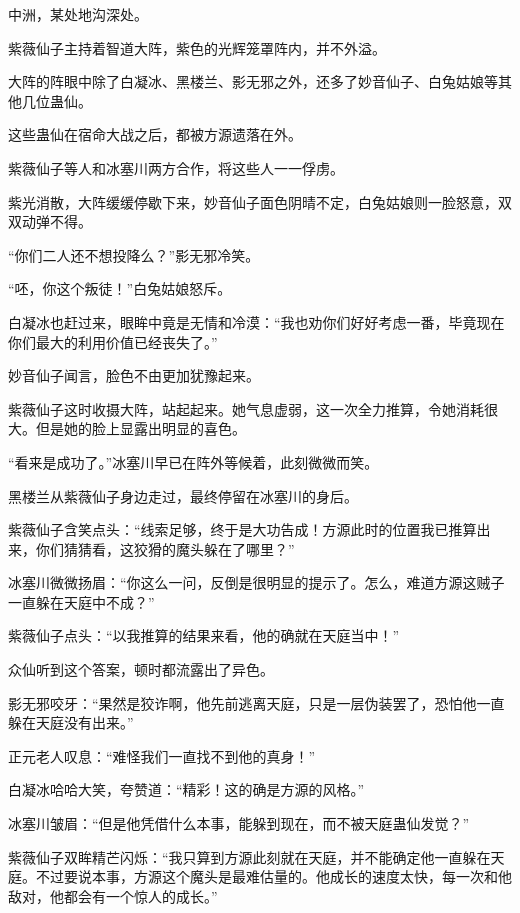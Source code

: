 
\begin{this_body}



中洲，某处地沟深处。

紫薇仙子主持着智道大阵，紫色的光辉笼罩阵内，并不外溢。

大阵的阵眼中除了白凝冰、黑楼兰、影无邪之外，还多了妙音仙子、白兔姑娘等其他几位蛊仙。

这些蛊仙在宿命大战之后，都被方源遗落在外。

紫薇仙子等人和冰塞川两方合作，将这些人一一俘虏。

紫光消散，大阵缓缓停歇下来，妙音仙子面色阴晴不定，白兔姑娘则一脸怒意，双双动弹不得。

“你们二人还不想投降么？”影无邪冷笑。

“呸，你这个叛徒！”白兔姑娘怒斥。

白凝冰也赶过来，眼眸中竟是无情和冷漠：“我也劝你们好好考虑一番，毕竟现在你们最大的利用价值已经丧失了。”

妙音仙子闻言，脸色不由更加犹豫起来。

紫薇仙子这时收摄大阵，站起起来。她气息虚弱，这一次全力推算，令她消耗很大。但是她的脸上显露出明显的喜色。

“看来是成功了。”冰塞川早已在阵外等候着，此刻微微而笑。

黑楼兰从紫薇仙子身边走过，最终停留在冰塞川的身后。

紫薇仙子含笑点头：“线索足够，终于是大功告成！方源此时的位置我已推算出来，你们猜猜看，这狡猾的魔头躲在了哪里？”

冰塞川微微扬眉：“你这么一问，反倒是很明显的提示了。怎么，难道方源这贼子一直躲在天庭中不成？”

紫薇仙子点头：“以我推算的结果来看，他的确就在天庭当中！”

众仙听到这个答案，顿时都流露出了异色。

影无邪咬牙：“果然是狡诈啊，他先前逃离天庭，只是一层伪装罢了，恐怕他一直躲在天庭没有出来。”

正元老人叹息：“难怪我们一直找不到他的真身！”

白凝冰哈哈大笑，夸赞道：“精彩！这的确是方源的风格。”

冰塞川皱眉：“但是他凭借什么本事，能躲到现在，而不被天庭蛊仙发觉？”

紫薇仙子双眸精芒闪烁：“我只算到方源此刻就在天庭，并不能确定他一直躲在天庭。不过要说本事，方源这个魔头是最难估量的。他成长的速度太快，每一次和他敌对，他都会有一个惊人的成长。”


\end{this_body}
